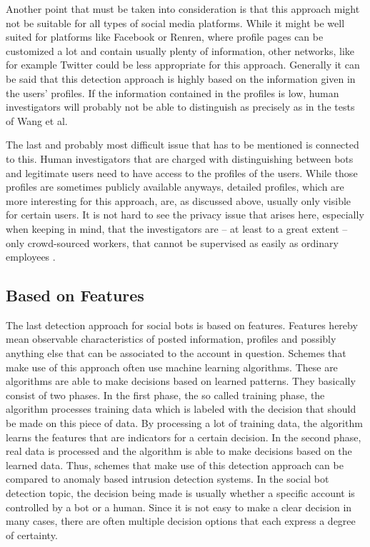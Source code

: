 Another point that must be taken into consideration is that this approach might not be suitable for all types of social media platforms. While it might be well suited for platforms like Facebook or Renren, where profile pages can be customized a lot and contain usually plenty of information, other networks, like for example Twitter could be less appropriate for this approach. Generally it can be said that this detection approach is highly based on the information given in the users' profiles. If the information contained in the profiles is low, human investigators will probably not be able to distinguish as precisely as in the tests of Wang et al.

The last and probably most difficult issue that has to be mentioned is connected to this. Human investigators that are charged with distinguishing between bots and legitimate users need to have access to the profiles of the users. While those profiles are sometimes publicly available anyways, detailed profiles, which are more interesting for this approach, are, as discussed above, usually only visible for certain users. It is not hard to see the privacy issue that arises here, especially when keeping in mind, that the investigators are -- at least to a great extent -- only crowd-sourced workers, that cannot be supervised as easily as ordinary employees \cite{ferrara15}.


\subsection{Based on Features}
The last detection approach for social bots is based on features. Features hereby mean observable characteristics of posted information, profiles and possibly anything else that can be associated to the account in question. Schemes that make use of this approach often use machine learning algorithms. These are algorithms are able to make decisions based on learned patterns. They basically consist of two phases. In the first phase, the so called training phase, the algorithm processes training data which is labeled with the decision that should be made on this piece of data. By processing a lot of training data, the algorithm learns the features that are indicators for a certain decision. In the second phase, real data is processed and the algorithm is able to make decisions based on the learned data. Thus, schemes that make use of this detection approach can be compared to anomaly based intrusion detection systems. In the social bot detection topic, the decision being made is usually whether a specific account is controlled by a bot or a human. Since it is not easy to make a clear decision in many cases, there are often multiple decision options that each express a degree of certainty.

